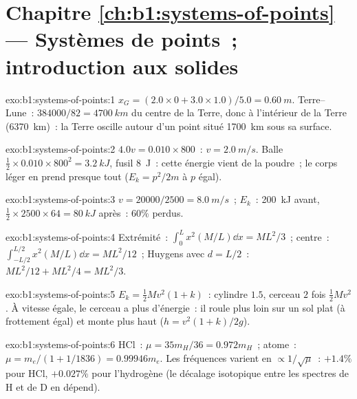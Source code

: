 \section*{Chapitre \ref{ch:b1:systems-of-points} --- Systèmes de points~; introduction aux solides}

\begin{solution}{exo:b1:systems-of-points:1}
$x_G = (2.0 \times 0 + 3.0 \times 1.0)/5.0 = \qty{0.60}{m}$. Terre--Lune~:
$384000/82 = \qty{4700}{km}$ du centre de la Terre, donc à l'intérieur de
la Terre (\qty{6370}{km})~: la Terre oscille autour d'un point situé
\qty{1700}{km} sous sa surface.
\end{solution}

\begin{solution}{exo:b1:systems-of-points:2}
$4.0v = 0.010 \times 800$~: $v = \qty{2.0}{m/s}$. Balle $\tfrac12 \times 0.010
\times 800^2 = \qty{3.2}{kJ}$, fusil \qty{8}{J}~: cette énergie vient de
la poudre~; le corps léger en prend presque tout ($E_k = p^2/2m$ à $p$ égal).
\end{solution}

\begin{solution}{exo:b1:systems-of-points:3}
$v = 20000/2500 = \qty{8.0}{m/s}$~; $E_k$~: \qty{200}{kJ} avant, $\tfrac12 \times
2500 \times 64 = \qty{80}{kJ}$ après~: $60\%$ perdus.
\end{solution}

\begin{solution}{exo:b1:systems-of-points:4}
Extrémité~: $\int_0^L x^2(M/L)\dd x = ML^2/3$~; centre~: $\int_{-L/2}^{L/2}x^2(M/L)
\dd x = ML^2/12$~; Huygens avec $d = L/2$~: $ML^2/12 + ML^2/4 = ML^2/3$.
\end{solution}

\begin{solution}{exo:b1:systems-of-points:5}
$E_k = \tfrac12 Mv^2(1 + k)$~: cylindre $1.5$, cerceau $2$ fois $\tfrac12 Mv^2$.
À vitesse égale, le cerceau a plus d'énergie~: il roule plus loin sur un
sol plat (à frottement égal) et monte plus haut ($h = v^2(1 + k)/2g$).
\end{solution}

\begin{solution}{exo:b1:systems-of-points:6}
HCl~: $\mu = 35m_H/36 = 0.972m_H$~; atome~: $\mu = m_e/(1 + 1/1836) =
0.99946m_e$. Les fréquences varient en $\propto 1/\sqrt\mu$~: $+1.4\%$ pour HCl, $+0.027\%$
pour l'hydrogène (le décalage isotopique entre les spectres de H et de D en dépend).
\end{solution}

